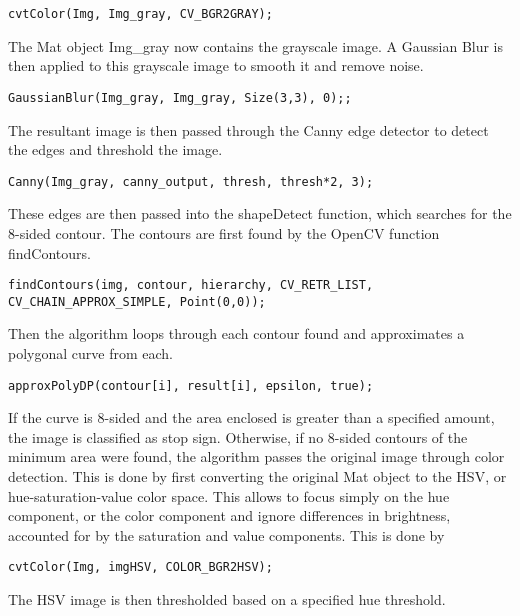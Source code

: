 \documentclass[letterpaper,10pt,titlepage]{article}
\begin{document}
\begin{lstlisting}
cvtColor(Img, Img_gray, CV_BGR2GRAY);
\end{lstlisting}

The Mat object Img\_gray now contains the grayscale image. A Gaussian Blur is
then applied to this grayscale image to smooth it and remove noise. 

\begin{lstlisting}
GaussianBlur(Img_gray, Img_gray, Size(3,3), 0);;
\end{lstlisting}

The resultant image is then passed through the Canny edge detector to detect 
the edges and threshold the image. 

\begin{lstlisting}
Canny(Img_gray, canny_output, thresh, thresh*2, 3);
\end{lstlisting}

These edges are then passed into the shapeDetect function, which searches for 
the 8-sided contour. The contours are first found by the OpenCV function 
findContours.

\begin{lstlisting}
findContours(img, contour, hierarchy, CV_RETR_LIST, CV_CHAIN_APPROX_SIMPLE, Point(0,0));
\end{lstlisting}

Then the algorithm loops through each contour found and approximates a 
polygonal curve from each.

\begin{lstlisting}
approxPolyDP(contour[i], result[i], epsilon, true);
\end{lstlisting}

If the curve is 8-sided and the area enclosed is greater than a specified
amount, the image is classified as stop sign. Otherwise, if no 8-sided contours
of the minimum area were found, the algorithm passes the original image through
color detection. This is done by first converting the original Mat object to
the HSV, or hue-saturation-value color space. This allows to focus simply on 
the hue component, or the color component and ignore differences in brightness,
accounted for by the saturation and value components. This is done by

\begin{lstlisting}
cvtColor(Img, imgHSV, COLOR_BGR2HSV);
\end{lstlisting}

The HSV image is then thresholded based on a specified hue threshold.
\end{document}

